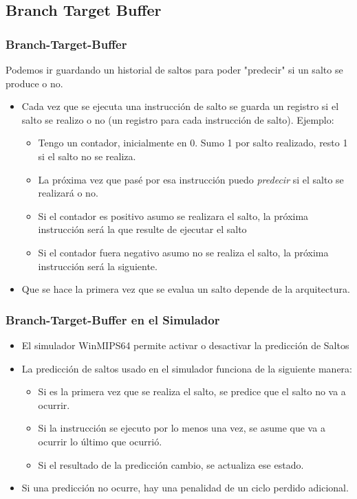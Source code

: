 \documentclass{beamer}
\begin{document}
\subsection{Branch Target Buffer}
\begin{frame}
\frametitle{Branch-Target-Buffer}
Podemos ir guardando un historial de saltos para poder "predecir" si un salto se produce o no.
\begin{itemize}
\item Cada vez que se ejecuta una instrucción de salto se guarda un registro si el salto se realizo o no (un registro para cada instrucción de salto). Ejemplo:
\begin{itemize}
\item Tengo un contador, inicialmente en 0. Sumo 1 por salto realizado, resto 1 si el salto no se realiza.
\item La próxima vez que pasé por esa instrucción puedo \emph{predecir} si el salto se realizará o no. 
\item Si el contador es positivo asumo se realizara el salto, la próxima instrucción será la que resulte de ejecutar el salto
\item Si el contador fuera negativo asumo no se realiza el salto, la próxima instrucción será la siguiente.
\end{itemize}
\item Que se hace la primera vez que se evalua un salto depende de la arquitectura.
\end{itemize}
\end{frame}

\begin{frame}
\frametitle{Branch-Target-Buffer en el Simulador}
\begin{itemize}
\item El simulador WinMIPS64 permite activar o desactivar la predicción de Saltos
\item La predicción de saltos usado en el simulador funciona de la siguiente manera:
\begin{itemize}
\item Si es la primera vez que se realiza el salto, se predice que el salto no va a ocurrir.
\item Si la instrucción se ejecuto por lo menos una vez, se asume que va a ocurrir lo último que ocurrió.
\item Si el resultado de la predicción cambio, se actualiza ese estado.
\end{itemize}
\item Si una predicción no ocurre, hay una penalidad de un ciclo perdido adicional.\end{itemize}
\end{frame}
\end{document}
